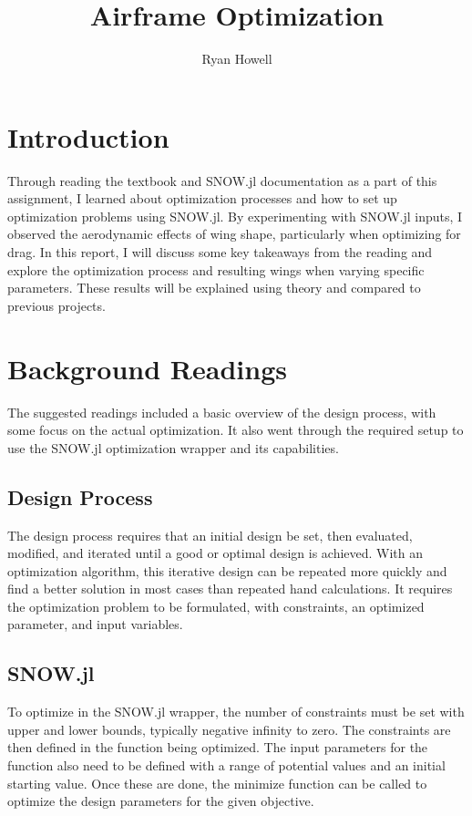 \documentclass{article}
\title{Airframe Optimization}
\author{Ryan Howell}
\begin{document}
\maketitle



\section{Introduction}

Through reading the textbook and SNOW.jl documentation as a part of this assignment, I learned about optimization processes and how to set up optimization problems using SNOW.jl. By experimenting with SNOW.jl inputs, I observed the aerodynamic effects of wing shape, particularly when optimizing for drag. In this report, I will discuss some key takeaways from the reading and explore the optimization process and resulting wings when varying specific parameters. These results will be explained using theory and compared to previous projects.

\section{Background Readings}
The suggested readings included a basic overview of the design process, with some focus on the actual optimization. It also went through the required setup to use the SNOW.jl optimization wrapper and its capabilities.

\subsection{Design Process}
The design process requires that an initial design be set, then evaluated, modified, and iterated until a good or optimal design is achieved. With an optimization algorithm, this iterative design can be repeated more quickly and find a better solution in most cases than repeated hand calculations. It requires the optimization problem to be formulated, with constraints, an optimized parameter, and input variables. 

\subsection{SNOW.jl}
To optimize in the SNOW.jl wrapper, the number of constraints must be set with upper and lower bounds, typically negative infinity to zero. The constraints are then defined in the function being optimized. The input parameters for the function also need to be defined with a range of potential values and an initial starting value. Once these are done, the minimize function can be called to optimize the design parameters for the given objective.
\end{document}
